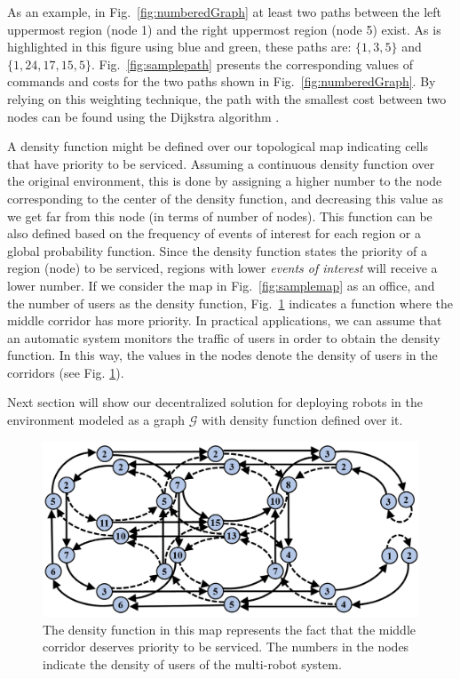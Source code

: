 \documentclass[smallcondensed]{svjour3}
\begin{document}
As an example, in Fig.~\ref{fig:numberedGraph} at least two paths  between the left uppermost region (node 1) and the right uppermost region (node 5) exist. As is highlighted in  this figure using blue and green, these paths are:  $\{1, 3, 5\}$ and $\{1, 24, 17, 15, 5\}$. Fig.~\ref{fig:samplepath} presents the corresponding values of commands and costs for the two paths shown in Fig.~\ref{fig:numberedGraph}. By relying on this weighting technique, the path with the smallest cost between two nodes can be found using the Dijkstra algorithm \cite{Dijkstra1959}.
%

A density function might be defined over our topological map indicating cells that have priority to be serviced.
%
Assuming a continuous density function over the original environment, this is done by assigning a higher number to the node corresponding to the center of the density function, and decreasing this value as we get far from this node (in terms of number of nodes). This function can be also defined based on the frequency of events of interest for each region or a global probability function. 
%
Since the density function states the priority of a region (node) to be serviced, regions with lower \textit{events of interest} will receive a lower number. 
%
If we consider the map in Fig.~\ref{fig:samplemap} as an office, and the number of users as the density function, Fig.~\ref{fig:density} indicates a function where the middle corridor has more priority. In practical applications, we can assume that an automatic system monitors the traffic of users in order to obtain the density function. In this way, the values in the nodes denote the density of users in the corridors (see Fig. \ref{fig:density}).

Next section will show our decentralized solution for deploying robots in the environment modeled as a graph $\mathcal{G}$ with density function defined over it.

\begin{figure}[t]
	\centering
	\includegraphics[width=0.8\columnwidth]{Figures/Fig7.png}
	\caption{The density function in this map represents the fact that the middle corridor deserves priority to be serviced. The numbers in the nodes indicate the density of users of the multi-robot system.}
	\label{fig:density}
\end{figure}
\end{document}
